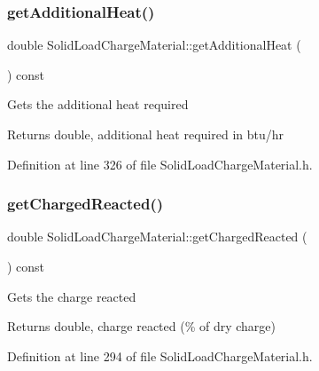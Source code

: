 \subsubsection{\texorpdfstring{get\+Additional\+Heat()}{getAdditionalHeat()}\hspace{0.1cm}{\footnotesize\ttfamily [3/3]}}
{\footnotesize\ttfamily double Solid\+Load\+Charge\+Material\+::get\+Additional\+Heat (\begin{DoxyParamCaption}{ }\end{DoxyParamCaption}) const\hspace{0.3cm}{\ttfamily [inline]}}

Gets the additional heat required \begin{DoxyReturn}{Returns}
double, additional heat required in btu/hr 
\end{DoxyReturn}


Definition at line 326 of file Solid\+Load\+Charge\+Material.\+h.

\mbox{\label{class_solid_load_charge_material_a7c7f05b6ee14eb5f07e5c48c30e9c7a1}} 
\subsubsection{\texorpdfstring{get\+Charged\+Reacted()}{getChargedReacted()}\hspace{0.1cm}{\footnotesize\ttfamily [1/3]}}
{\footnotesize\ttfamily double Solid\+Load\+Charge\+Material\+::get\+Charged\+Reacted (\begin{DoxyParamCaption}{ }\end{DoxyParamCaption}) const\hspace{0.3cm}{\ttfamily [inline]}}

Gets the charge reacted \begin{DoxyReturn}{Returns}
double, charge reacted (\% of dry charge) 
\end{DoxyReturn}


Definition at line 294 of file Solid\+Load\+Charge\+Material.\+h.

\mbox{\label{class_solid_load_charge_material_a7c7f05b6ee14eb5f07e5c48c30e9c7a1}} 
